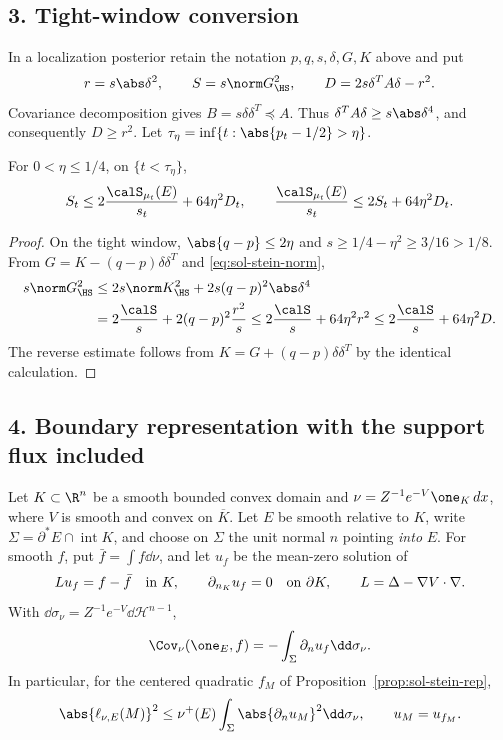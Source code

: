 \documentclass[../main.tex]{subfiles}
\begin{document}
\subsection*{3. Tight-window conversion}

In a localization posterior retain the notation $p,q,s,\delta,G,K$ above and put
\[
 r=s\abs\delta^2,\qquad S=s\norm G_\HS^2,
 \qquad D=2s\delta^TA\delta-r^2.
\]
Covariance decomposition gives $B=s\delta\delta^T\preceq A$.  Thus
$\delta^TA\delta\ge s\abs\delta^4$, and consequently $D\ge r^2$.  Let
$\tau_\eta=\inf\{t:\abs{p_t-1/2}>\eta\}$.

\begin{lemma}[= Lemma~\ref{lem:stein-vs-source}]
\label{lem:sol-stein-vs-source}
For $0<\eta\le1/4$, on $\{t<\tau_\eta\}$,
\[
 S_t\le2\frac{\calS_{\mu_t}(E)}{s_t}+64\eta^2D_t,
 \qquad
 \frac{\calS_{\mu_t}(E)}{s_t}\le2S_t+64\eta^2D_t.
\]
\end{lemma}

\begin{proof}
On the tight window, $\abs{q-p}\le2\eta$ and
$s\ge1/4-\eta^2\ge3/16>1/8$.  From $G=K-(q-p)\delta\delta^T$ and
\eqref{eq:sol-stein-norm},
\begin{align*}
 s\norm G_\HS^2
 &\le2s\norm K_\HS^2+2s(q-p)^2\abs\delta^4\\
 &=2\frac{\calS}{s}+2(q-p)^2\frac{r^2}{s}
 \le2\frac{\calS}{s}+64\eta^2r^2
 \le2\frac{\calS}{s}+64\eta^2D.
\end{align*}
The reverse estimate follows from $K=G+(q-p)\delta\delta^T$ by the identical calculation.
\end{proof}

\subsection*{4. Boundary representation with the support flux included}

\begin{lemma}[= Lemma~\ref{lem:boundary-rep}]
\label{lem:sol-boundary-rep}
Let $K\subset\R^n$ be a smooth bounded convex domain and
$\nu=Z^{-1}e^{-V}\one_K\,dx$, where $V$ is smooth and convex on $\overline K$.  Let $E$ be
smooth relative to $K$, write
$\Sigma=\partial^*E\cap\operatorname{int}K$, and choose on $\Sigma$ the unit normal $n$
pointing \emph{into} $E$.  For smooth $f$, put $\bar f=\int f\dd\nu$, and let $u_f$ be the
mean-zero solution of
\[
 Lu_f=f-\bar f\quad\hbox{in }K,
 \qquad \partial_{n_K}u_f=0\quad\hbox{on }\partial K,
 \qquad L=\Delta-\nabla V\cdot\nabla.
\]
With $\dd\sigma_\nu=Z^{-1}e^{-V}\dd\mathcal H^{n-1}$,
\begin{equation}\label{eq:sol-boundary-rep}
 \Cov_\nu(\one_E,f)=-\int_\Sigma\partial_nu_f\dd\sigma_\nu.
\end{equation}
In particular, for the centered quadratic $f_M$ of
Proposition~\ref{prop:sol-stein-rep},
\begin{equation}\label{eq:sol-trace-CS}
 \abs{\ell_{\nu,E}(M)}^2
 \le\nu^+(E)\int_\Sigma\abs{\partial_nu_M}^2\dd\sigma_\nu,
 \qquad u_M=u_{f_M}.
\end{equation}
\end{lemma}
\end{document}
